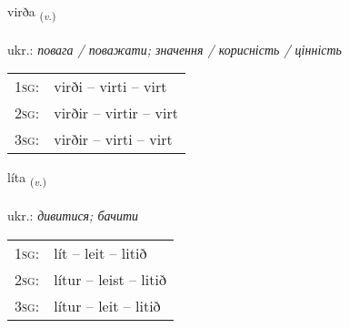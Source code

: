 \documentclass[frontgrid, backgrid]{flacards}\usepackage[]{graphicx}\usepackage[]{xcolor}
\begin{document}
{virða \small{\textsubscript{(\textit{v.})}} \\[1ex] %
\textphonetic{[vɪrða]} \\
ukr.: \emph{повага / поважати; значення / корисність / цінність} \\  [2ex]
\renewcommand*{\arraystretch}{0.8}
\begin{tabular}{p{1cm}l}
\textsc{1sg}: & virði -- virti -- virt \\ 
\textsc{2sg}: & virðir -- virtir -- virt \\ 
\textsc{3sg}: & virðir -- virti -- virt \\ 
\end{tabular}
}

\renewcommand{\flhead}{\vskip5pt \fboxsep=0pt {\small\bfseries\footnotesize Sagnorð | дієслово}}
\renewcommand{\fcfoot}{\vskip5pt \fboxsep=0pt \hspace{2pt}{\small\bfseries\footnotesize 1K}}

\renewcommand{\blhead}{\vskip5pt {\small\bfseries\footnotesize Sagnorð | дієслово }}
\renewcommand{\bcfoot}{\vskip5pt \hspace{2pt}{\small\bfseries\footnotesize 1K}}


{líta \small{\textsubscript{(\textit{v.})}} \\[1ex] %
\textphonetic{[liːta]} \\
ukr.: \emph{дивитися; бачити} \\  [2ex]
\renewcommand*{\arraystretch}{0.8}
\begin{tabular}{p{1cm}l}
\textsc{1sg}: & lít -- leit -- litið \\ 
\textsc{2sg}: & lítur -- leist -- litið \\ 
\textsc{3sg}: & lítur -- leit -- litið \\ 
\end{tabular}
}

\renewcommand{\flhead}{\vskip5pt \fboxsep=0pt {\small\bfseries\footnotesize Sagnorð | дієслово}}
\renewcommand{\fcfoot}{\vskip5pt \fboxsep=0pt \hspace{2pt}{\small\bfseries\footnotesize 1K}}
\end{document}
